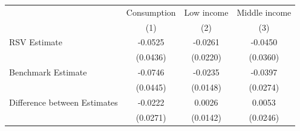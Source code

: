 \begin{threeparttable}
\begin{tabular}{l | ccc}
\toprule
& \multicolumn{1}{c}{Consumption} & \multicolumn{1}{c}{Low income} & \multicolumn{1}{c}{Middle income} \\
& (1) & (2) & (3) \\
\midrule
  RSV Estimate & -0.0525 & -0.0261 & -0.0450 \\
           & (0.0436) & (0.0220) & (0.0360) \\
\midrule
\addlinespace[0.3em]
  Benchmark Estimate & -0.0746 & -0.0235 & -0.0397 \\
           & (0.0445) & (0.0148) & (0.0274) \\
\midrule
  Difference between Estimates & -0.0222 & 0.0026 & 0.0053 \\
           & (0.0271) & (0.0142) & (0.0246) \\
\bottomrule
\end{tabular}
\end{threeparttable}
